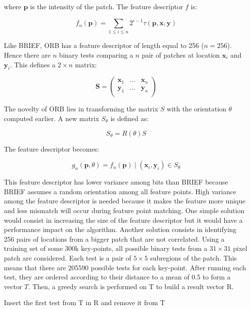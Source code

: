 \documentclass[11pt]{report}
\begin{document}
where $\textbf{p}$ is the intensity of the patch. The feature descriptor $f$ is:

\[
  f_n(\mathbf{p}) = \sum_{1 \leq i \leq n}  2^{i-1} \tau(\mathbf{p}, \mathbf{x}, \mathbf{y})
\]

Like BRIEF, ORB has a feature descriptor of length equal to 256 ($n=256$). Hence there are $n$ binary tests comparing a $n$ pair of patches at location $\mathbf{x}_i$ and $\mathbf{y}_i$. This defines a $2\times n$ matrix:

\[
\mathbf{S} = 
\left ( \begin{matrix} 
\mathbf{x}_1 & \hdots & \mathbf{x}_n \\
\mathbf{y}_1 & \hdots & \mathbf{y}_n \\
\end{matrix} \right )
\]

The novelty of ORB lies in transforming the matrix $S$ with the orientation $\theta$ computed earlier. A new matrix $S_\theta$ is defined as:

\[
  S_\theta = R(\theta)S
\]

The feature descriptor becomes:

\[
  g_n(\mathbf{p}, \theta) = f_n(\mathbf{p}) \mid (\mathbf{x}_i, \mathbf{y}_i) \in S_\theta
\]

This feature descriptor has lower variance among bits than BRIEF because BRIEF assumes a random orientation among all feature points. High variance among the feature descriptor is needed because it makes the feature more unique and less mismatch will occur during feature point matching. One simple solution would consist in increasing the size of the feature descriptor but it would have a performance impact on the algorithm. Another solution consists in identifying 256 pairs of locations from a bigger patch that are not correlated. Using a training set of some 300k key-points, all possible binary tests from a $31\times 31$ pixel patch are considered. Each test is a pair of $5\times 5$ subregions of the patch. This means that there are 205590 possible tests for each key-point. After running each test, they are ordered according to their distance to a mean of 0.5 to form a vector $T$. Then, a greedy search is performed on T to build a result vector R.

\begin{algorithm}[H]

  Insert the first test from T in R and remove it from T\;

\end{algorithm}
\end{document}
